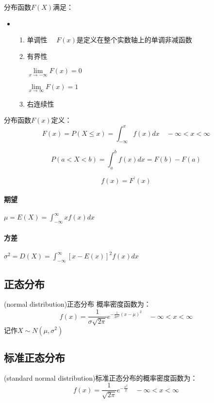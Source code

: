 \documentclass[UTF8,10pt]{book}
\begin{document}
				分布函数$F(X)$满足：
				\begin{itemize}
					\item [] {
						\begin{enumerate}
							\item 单调性 $\quad F(x)$是定义在整个实数轴上的单调非减函数
							\item 有界性 
							
							$\lim\limits_{x \to -\infty} F(x) = 0$
							
							$\lim\limits_{x \to \infty} F(x) = 1$
							\item 右连续性
						\end{enumerate}
					}
				\end{itemize}
			
                分布函数$F(x)$定义：
                $$F(x) = P(X\le x) = \int_{-\infty}^x f(x) dx \quad  -\infty <x<\infty$$

                $$ P(a<X<b) =  \int_{a}^b f(x) dx = F(b) -F(a) $$

                $$ f(x) = F^{'}(x) $$

                \paragraph{期望} $ \mu=E(X) = \int_{-\infty}^\infty xf(x) dx $
                \paragraph{方差} $ \sigma^2 = D(X) = \int_{-\infty}^\infty [x-E(x)]^2 f(x) dx $

            \subsection{正态分布} 
                (normal distribution)正态分布
                概率密度函数为：
                $$ f(x) = \frac{1}{\sigma \sqrt{2\pi}} e^{-\frac{1}{2\sigma^2} (x-\mu)^2}
                \quad
                -\infty < x < \infty
                $$
                记作$X\sim N(\mu,\sigma^2) $

            \subsection{标准正态分布}
                (standard normal distribution)标准正态分布的概率密度函数为：
                $$ f(x) = \frac{1}{\sqrt{2\pi}} e^{-\frac{x^2}{2} }
                \quad
                -\infty < x < \infty
                $$
\end{document}
